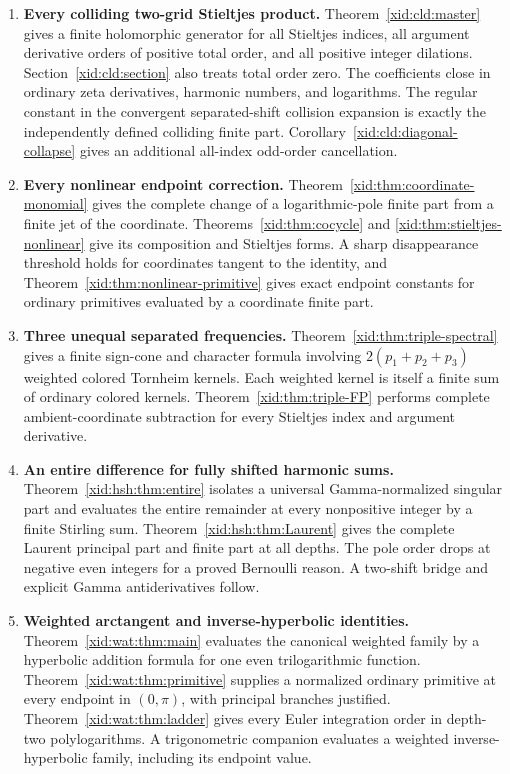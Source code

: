 \begin{enumerate}[label=\textbf{\arabic*.},leftmargin=*]
\item \textbf{Every colliding two-grid Stieltjes product.}
Theorem~\ref{xid:cld:master} gives a finite holomorphic generator for all
Stieltjes indices, all argument derivative orders of positive total order,
and all positive integer dilations. Section~\ref{xid:cld:section} also treats
total order zero. The coefficients close in ordinary zeta derivatives,
harmonic numbers, and logarithms. The regular constant in the convergent
separated-shift collision expansion is exactly the independently defined
colliding finite part. Corollary~\ref{xid:cld:diagonal-collapse} gives an
additional all-index odd-order cancellation.

\item \textbf{Every nonlinear endpoint correction.}
Theorem~\ref{xid:thm:coordinate-monomial} gives the complete change of a
logarithmic-pole finite part from a finite jet of the coordinate.
Theorems~\ref{xid:thm:cocycle} and \ref{xid:thm:stieltjes-nonlinear} give its
composition and Stieltjes forms. A sharp disappearance threshold holds
for coordinates tangent to the identity, and
Theorem~\ref{xid:thm:nonlinear-primitive} gives exact endpoint constants for
ordinary primitives evaluated by a coordinate finite part.

\item \textbf{Three unequal separated frequencies.}
Theorem~\ref{xid:thm:triple-spectral} gives a finite sign-cone and character
formula involving $2(p_1+p_2+p_3)$ weighted colored Tornheim kernels.
Each weighted kernel is itself a finite sum of ordinary colored kernels.
Theorem~\ref{xid:thm:triple-FP} performs complete ambient-coordinate
subtraction for every Stieltjes index and argument derivative.

\item \textbf{An entire difference for fully shifted harmonic sums.}
Theorem~\ref{xid:hsh:thm:entire} isolates a universal Gamma-normalized
singular part and evaluates the entire remainder at every nonpositive
integer by a finite Stirling sum. Theorem~\ref{xid:hsh:thm:Laurent} gives
the complete Laurent principal part and finite part at all depths.
The pole order drops at negative even integers for a proved Bernoulli
reason. A two-shift bridge and explicit Gamma antiderivatives follow.

\item \textbf{Weighted arctangent and inverse-hyperbolic identities.}
Theorem~\ref{xid:wat:thm:main} evaluates the canonical weighted family by a
hyperbolic addition formula for one even trilogarithmic function.
Theorem~\ref{xid:wat:thm:primitive} supplies a normalized ordinary primitive
at every endpoint in $(0,\pi)$, with principal branches justified.
Theorem~\ref{xid:wat:thm:ladder} gives every Euler integration order in
depth-two polylogarithms. A trigonometric companion evaluates a weighted
inverse-hyperbolic family, including its endpoint value.
\end{enumerate}

